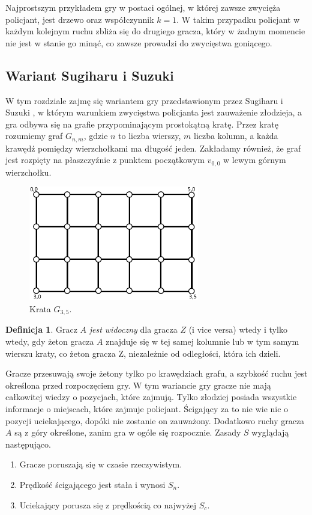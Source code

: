 \documentclass[brudnopis]{xmgr}
\theoremstyle{definition}
\newtheorem{Definicja}{Definicja}
\begin{document}
Najprostszym przykładem gry w postaci ogólnej, w której zawsze zwycięża policjant, jest drzewo oraz współczynnik $k = 1$. W takim przypadku policjant w każdym kolejnym ruchu zbliża się do drugiego gracza, który w żadnym momencie nie jest w stanie go minąć, co zawsze prowadzi do zwycięstwa goniącego.

\subsection{Wariant Sugiharu i Suzuki} \label{sugiharu}
W tym rozdziale zajmę się wariantem gry przedstawionym przez Sugiharu i Suzuki \cite{sugiharu}, w którym warunkiem zwycięstwa policjanta jest zauważenie złodzieja, a gra odbywa się na grafie przypominającym prostokątną kratę.
Przez kratę rozumiemy graf $G_{n,m}$, gdzie $n$ to liczba wierszy, $m$ liczba kolumn, a każda krawędź pomiędzy wierzchołkami ma długość jeden. Zakładamy również, że graf jest rozpięty na płaszczyźnie z punktem początkowym $v_{0,0}$ w lewym górnym wierzchołku.
\begin{figure}[ht!]
   \centering
    \includegraphics[height=5cm]{rysunki/siatka_3_5.png}
    \caption{Krata $G_{3,5}$.}
\end{figure}

\begin{Definicja}
  Gracz $A$ \emph{jest widoczny} dla gracza $Z$ (i vice versa) wtedy i tylko wtedy, gdy żeton gracza $A$ znajduje się w tej samej kolumnie lub w tym samym wierszu kraty, co żeton gracza Z, niezależnie od odległości, która ich dzieli.
\end{Definicja}

Gracze przesuwają swoje żetony tylko po krawędziach grafu, a szybkość ruchu jest określona przed rozpoczęciem gry.
W tym wariancie gry gracze nie mają całkowitej wiedzy o pozycjach, które zajmują. Tylko złodziej posiada wszystkie informacje o miejscach, które zajmuje policjant. Ścigający za to nie wie nic o pozycji uciekającego, dopóki nie zostanie on zauważony. Dodatkowo ruchy gracza $A$ są z góry określone, zanim gra w ogóle się rozpocznie.
Zasady $S$ wyglądają następująco.
\begin{enumerate}
  \item Gracze poruszają się w czasie rzeczywistym.
  \item Prędkość ścigającego jest stała i wynosi $S_n$.
  \item Uciekający porusza się z prędkością co najwyżej $S_c$.
\end{enumerate}
\end{document}
